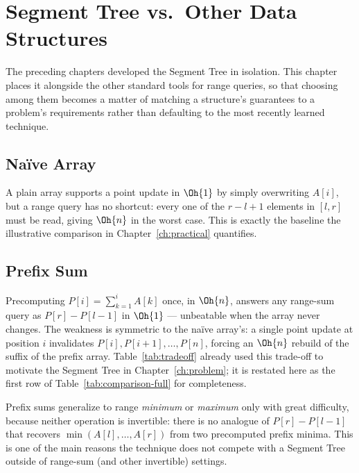 
\chapter{Segment Tree vs.\ Other Data Structures}
\label{ch:comparison}

The preceding chapters developed the Segment Tree in isolation. This chapter places it alongside the other standard tools for range queries, so that choosing among them becomes a matter of matching a structure's guarantees to a problem's requirements rather than defaulting to the most recently learned technique.

\section{Na\"ive Array}
A plain array supports a point update in $\Oh{1}$ by simply overwriting $A[i]$, but a range query has no shortcut: every one of the $r-l+1$ elements in $[l,r]$ must be read, giving $\Oh{n}$ in the worst case. This is exactly the baseline the illustrative comparison in Chapter~\ref{ch:practical} quantifies.

\section{Prefix Sum}
\label{sec:prefixsum}
Precomputing $P[i]=\sum_{k=1}^{i}A[k]$ once, in $\Oh{n}$, answers any range-sum query as $P[r]-P[l-1]$ in $\Oh{1}$ --- unbeatable when the array never changes. The weakness is symmetric to the na\"ive array's: a single point update at position $i$ invalidates $P[i],P[i+1],\ldots,P[n]$, forcing an $\Oh{n}$ rebuild of the suffix of the prefix array. Table~\ref{tab:tradeoff} already used this trade-off to motivate the Segment Tree in Chapter~\ref{ch:problem}; it is restated here as the first row of Table~\ref{tab:comparison-full} for completeness.

\begin{pitfall}
Prefix sums generalize to range \emph{minimum} or \emph{maximum} only with great difficulty, because neither operation is invertible: there is no analogue of $P[r]-P[l-1]$ that recovers $\min(A[l],\ldots,A[r])$ from two precomputed prefix minima. This is one of the main reasons the technique does not compete with a Segment Tree outside of range-sum (and other invertible) settings.
\end{pitfall}

